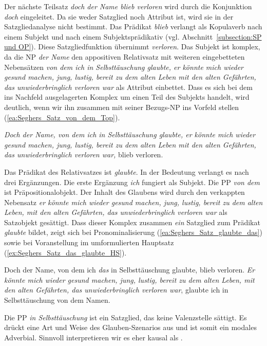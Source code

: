 Der nächste Teilsatz \textit{doch der Name blieb verloren} wird durch die Konjunktion \textit{doch} eingeleitet. Da sie weder Satzglied noch Attribut ist, wird sie in der Satzgliedanalyse nicht bestimmt. Das Prädikat \textit{blieb} verlangt als Kopulaverb nach einem Subjekt und nach einem Subjektsprädikativ (vgl. Abschnitt~\ref{subsection:SP und OP}). Diese Satzgliedfunktion übernimmt \textit{verloren}. Das Subjekt ist komplex, da die NP \textit{der Name} den appositiven Relativsatz mit weiteren eingebetteten Nebensätzen \textit{von dem ich in Selbsttäuschung glaubte, er könnte mich wieder gesund machen, jung, lustig, bereit zu dem alten Leben mit den alten Gefährten, das unwiederbringlich verloren war} als Attribut einbettet. Dass es sich bei dem ins Nachfeld ausgelagerten Komplex um einen Teil des Subjekts handelt, wird deutlich, wenn wir ihn zusammen mit seiner Bezugs-NP ins Vorfeld stellen (\ref{ea:Seghers_Satz_von_dem_Top}).

\ea \label{ea:Seghers_Satz_von_dem_Top} \textit{Doch der Name, von dem ich in Selbsttäuschung glaubte, er könnte mich wieder gesund machen, jung, lustig, bereit zu dem alten Leben mit den alten Gefährten, das unwiederbringlich verloren war,} blieb verloren.
\z 

Das Prädikat des Relativsatzes ist \textit{glaubte}. In der Bedeutung  verlangt es nach drei Ergänzungen. Die erste Ergänzung \textit{ich} fungiert als Subjekt. Die PP \textit{von dem} ist Präpositionalobjekt. Der Inhalt des Glaubens wird durch den verkappten Nebensatz \textit{er könnte mich wieder gesund machen, jung, lustig, bereit zu dem alten Leben, mit den alten Gefährten, das unwiederbringlich verloren war} als Satzobjekt gesättigt. Dass dieser Komplex zusammen \textit{ein} Satzglied zum Prädikat \textit{glaubte} bildet, zeigt sich bei Pronominalisierung (\ref{ea:Seghers_Satz_glaubte_das}) sowie bei Voranstellung im umformulierten Hauptsatz (\ref{ex:Seghers_Satz_das_glaubte_HS}).

\ea \label{ea:Seghers_Satz_glaubte}
\ea \label{ea:Seghers_Satz_glaubte_das} Doch der Name, von dem ich \textit{das} in Selbsttäuschung glaubte, blieb verloren.
\ex \label{ex:Seghers_Satz_das_glaubte_HS} \textit{Er könnte mich wieder gesund machen, jung, lustig, bereit zu dem alten Leben, mit den alten Gefährten, das unwiederbringlich verloren war}, glaubte ich in Selbsttäuschung von dem Namen.
\z 
\z 

Die PP \textit{in Selbsttäuschung} ist ein Satzglied, das keine Valenzstelle sättigt. Es drückt eine Art und Weise des Glauben-Szenarios aus und ist somit ein modales Adverbial. Sinnvoll interpretieren wir es eher kausal als .

